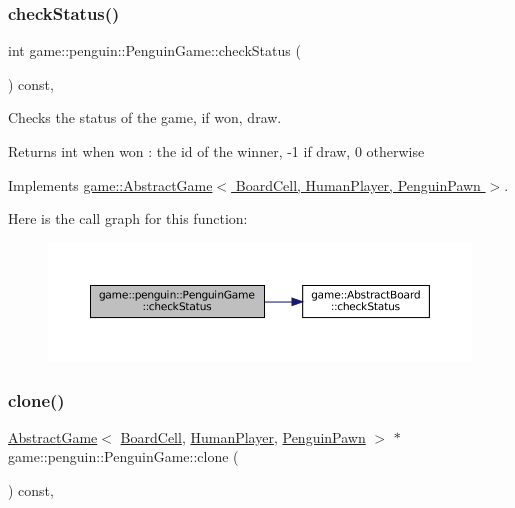 \subsubsection{\texorpdfstring{check\+Status()}{checkStatus()}}
{\footnotesize\ttfamily int game\+::penguin\+::\+Penguin\+Game\+::check\+Status (\begin{DoxyParamCaption}{ }\end{DoxyParamCaption}) const\hspace{0.3cm}{\ttfamily [override]}, {\ttfamily [virtual]}}



Checks the status of the game, if won, draw. 

\begin{DoxyReturn}{Returns}
int when won \+: the id of the winner, -\/1 if draw, 0 otherwise 
\end{DoxyReturn}


Implements \hyperlink{classgame_1_1_abstract_game_a3683d4f37908f769a470af6ebf73d849}{game\+::\+Abstract\+Game$<$ Board\+Cell, Human\+Player, Penguin\+Pawn $>$}.

Here is the call graph for this function\+:
\nopagebreak
\begin{figure}[H]
\begin{center}
\leavevmode
\includegraphics[width=350pt]{classgame_1_1penguin_1_1_penguin_game_af255dc5b05ef5244ac864d4aa2d3be2e_cgraph}
\end{center}
\end{figure}
\mbox{\label{classgame_1_1penguin_1_1_penguin_game_af4277cfe44814a9b99051348f25ce264}} 
\subsubsection{\texorpdfstring{clone()}{clone()}}
{\footnotesize\ttfamily \hyperlink{classgame_1_1_abstract_game}{Abstract\+Game}$<$ \hyperlink{classgame_1_1penguin_1_1_board_cell}{Board\+Cell}, \hyperlink{classgame_1_1penguin_1_1_human_player}{Human\+Player}, \hyperlink{classgame_1_1penguin_1_1_penguin_pawn}{Penguin\+Pawn} $>$ $\ast$ game\+::penguin\+::\+Penguin\+Game\+::clone (\begin{DoxyParamCaption}{ }\end{DoxyParamCaption}) const\hspace{0.3cm}{\ttfamily [override]}, {\ttfamily [virtual]}}



